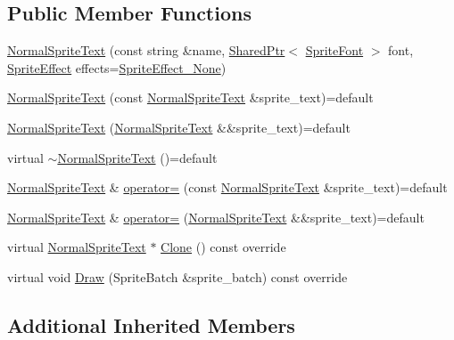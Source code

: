 \subsection*{Public Member Functions}
\begin{DoxyCompactItemize}
\item 
\hyperlink{classmage_1_1_normal_sprite_text_af91e5d22a02044c4159eefdc161c5dec}{Normal\+Sprite\+Text} (const string \&name, \hyperlink{namespacemage_a1e01ae66713838a7a67d30e44c67703e}{Shared\+Ptr}$<$ \hyperlink{classmage_1_1_sprite_font}{Sprite\+Font} $>$ font, \hyperlink{namespacemage_a9cfe18123066ba4236f548f9de75d881}{Sprite\+Effect} effects=\hyperlink{namespacemage_a9cfe18123066ba4236f548f9de75d881af3c275fbfacfe174da928b2f24dfa515}{Sprite\+Effect\+\_\+\+None})
\item 
\hyperlink{classmage_1_1_normal_sprite_text_a3bd8f94a53caeb7ead9312da6b9b849a}{Normal\+Sprite\+Text} (const \hyperlink{classmage_1_1_normal_sprite_text}{Normal\+Sprite\+Text} \&sprite\+\_\+text)=default
\item 
\hyperlink{classmage_1_1_normal_sprite_text_ae16d982e1d959b6b80f82610b07ec15b}{Normal\+Sprite\+Text} (\hyperlink{classmage_1_1_normal_sprite_text}{Normal\+Sprite\+Text} \&\&sprite\+\_\+text)=default
\item 
virtual \hyperlink{classmage_1_1_normal_sprite_text_a5ead5607cb41849419827ff231b4ea9d}{$\sim$\+Normal\+Sprite\+Text} ()=default
\item 
\hyperlink{classmage_1_1_normal_sprite_text}{Normal\+Sprite\+Text} \& \hyperlink{classmage_1_1_normal_sprite_text_a1c0f30872c4d3114f1e53183958354e5}{operator=} (const \hyperlink{classmage_1_1_normal_sprite_text}{Normal\+Sprite\+Text} \&sprite\+\_\+text)=default
\item 
\hyperlink{classmage_1_1_normal_sprite_text}{Normal\+Sprite\+Text} \& \hyperlink{classmage_1_1_normal_sprite_text_a034dd8c1c084216a247896ffbe50e61d}{operator=} (\hyperlink{classmage_1_1_normal_sprite_text}{Normal\+Sprite\+Text} \&\&sprite\+\_\+text)=default
\item 
virtual \hyperlink{classmage_1_1_normal_sprite_text}{Normal\+Sprite\+Text} $\ast$ \hyperlink{classmage_1_1_normal_sprite_text_aef48e90667849cd9ec01510baf1394cb}{Clone} () const override
\item 
virtual void \hyperlink{classmage_1_1_normal_sprite_text_ad2a1b02bea18afd6bf61b106a727a355}{Draw} (Sprite\+Batch \&sprite\+\_\+batch) const override
\end{DoxyCompactItemize}
\subsection*{Additional Inherited Members}


